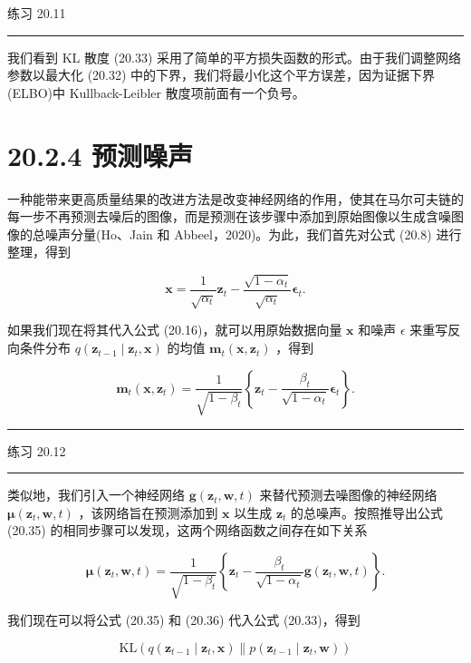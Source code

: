 \documentclass[10pt]{report}
\newcommand{\HRule}{\begin{center}\rule{0.9\linewidth}{0.2mm}\end{center}}
\begin{document}
练习 20.11

\HRule

我们看到 KL 散度 (20.33) 采用了简单的平方损失函数的形式。由于我们调整网络参数以最大化 (20.32) 中的下界，我们将最小化这个平方误差，因为证据下界(ELBO)中 Kullback-Leibler 散度项前面有一个负号。

\section*{20.2.4 预测噪声}

一种能带来更高质量结果的改进方法是改变神经网络的作用，使其在马尔可夫链的每一步不再预测去噪后的图像，而是预测在该步骤中添加到原始图像以生成含噪图像的总噪声分量(Ho、Jain 和 Abbeel，2020)。为此，我们首先对公式 (20.8) 进行整理，得到

\[
\mathbf{x} = \frac{1}{\sqrt{{\alpha }_{t}}}{\mathbf{z}}_{t} - \frac{\sqrt{1 - {\alpha }_{t}}}{\sqrt{{\alpha }_{t}}}{\mathbf{\epsilon }}_{t}. \tag{20.34}
\]

如果我们现在将其代入公式 (20.16)，就可以用原始数据向量 \(\mathbf{x}\) 和噪声 \(\epsilon\) 来重写反向条件分布 \(q\left( {{\mathbf{z}}_{t - 1} \mid  {\mathbf{z}}_{t},\mathbf{x}}\right)\) 的均值 \({\mathbf{m}}_{t}\left( {\mathbf{x},{\mathbf{z}}_{t}}\right)\) ，得到

\[
{\mathbf{m}}_{t}\left( {\mathbf{x},{\mathbf{z}}_{t}}\right)  = \frac{1}{\sqrt{1 - {\beta }_{t}}}\left\{  {{\mathbf{z}}_{t} - \frac{{\beta }_{t}}{\sqrt{1 - {\alpha }_{t}}}{\mathbf{\epsilon }}_{t}}\right\}  . \tag{20.35}
\]

\HRule

练习 20.12

\HRule

类似地，我们引入一个神经网络 \(\mathbf{g}\left( {{\mathbf{z}}_{t},\mathbf{w},t}\right)\) 来替代预测去噪图像的神经网络 \(\mathbf{\mu }\left( {{\mathbf{z}}_{t},\mathbf{w},t}\right)\) ，该网络旨在预测添加到 \(\mathbf{x}\) 以生成 \({\mathbf{z}}_{t}\) 的总噪声。按照推导出公式 (20.35) 的相同步骤可以发现，这两个网络函数之间存在如下关系

\[
\mathbf{\mu }\left( {{\mathbf{z}}_{t},\mathbf{w},t}\right)  = \frac{1}{\sqrt{1 - {\beta }_{t}}}\left\{  {{\mathbf{z}}_{t} - \frac{{\beta }_{t}}{\sqrt{1 - {\alpha }_{t}}}\mathbf{g}\left( {{\mathbf{z}}_{t},\mathbf{w},t}\right) }\right\}  . \tag{20.36}
\]

我们现在可以将公式 (20.35) 和 (20.36) 代入公式 (20.33)，得到

\[
\mathrm{{KL}}\left( {q\left( {{\mathbf{z}}_{t - 1} \mid  {\mathbf{z}}_{t},\mathbf{x}}\right) \parallel p\left( {{\mathbf{z}}_{t - 1} \mid  {\mathbf{z}}_{t},\mathbf{w}}\right) }\right)
\]
\end{document}
